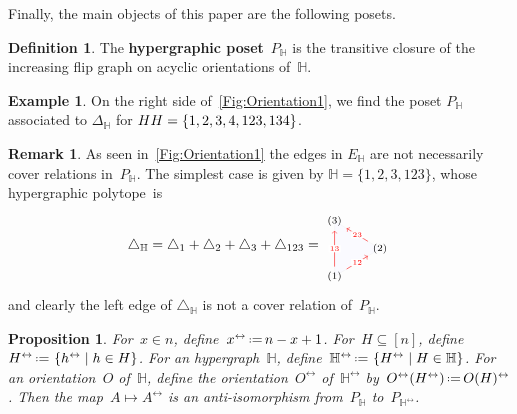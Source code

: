 \documentclass[reqno]{amsart}
\newtheorem{proposition}[theorem]{Proposition}
\theoremstyle{definition}
\newtheorem{definition}[theorem]{Definition}
\newtheorem{example}[theorem]{Example}
\newtheorem{remark}[theorem]{Remark}
\newcommand{\set}[2]{\left\{ #1 \;\middle|\; #2 \right\}} %
\newcommand{\eqdef}{\mbox{\,\raisebox{0.2ex}{\scriptsize\ensuremath{\mathrm:}}\ensuremath{=}\,}} %
\newcommand{\simplex}{\triangle} %
\newcommand{\defn}[1]{\textbf{\textsf{\color{PineGreen} #1}}} %
\newcommand{\nantel}[1]{\todo[size=\tiny,color=red!30]{ #1 \\ \hfill --- N.}\,}
\newcommand{\HH}{\mathbb H}  %
\begin{document}
Finally, the main objects of this paper are the following posets.

\begin{definition}
The \defn{hypergraphic poset}~$P_\HH$ is the transitive closure of the increasing flip graph on acyclic orientations of~$\HH$.
\end{definition}

\begin{example} On the right side of~\cref{Fig:Orientation1}, we find the poset $P_\HH$ associated to $\Delta_\HH$ for $\\HH=\{ 1, 2, 3, 4, 123, 134 \}$. 
\nantel{done}
\end{example}

\begin{remark}
\label{rem:edgeNotCover}
As seen in~\cref{Fig:Orientation1} the edges in $E_\HH$ are not necessarily cover relations in~$P_\HH$.
The simplest case is given by
$\HH=\{ 1, 2, 3, 123 \}$, 
whose hypergraphic polytope~is
\[
	\simplex_\HH = \simplex_1 + \simplex_2 + \simplex_3 + \simplex_{123} =
	\begin{tikzpicture}[scale=.7,baseline=.0cm]
		\draw [color=gray!10,fill=blue!2] (0,-1)--(0,1)--(1.632,0)--(0,-1) ; 
		\node (a) at (0,-1) {$\scriptstyle (1)$};
		\node (b) at (1.632,0) {$\scriptstyle (2)$};
		\node (c) at (0,1) {$\scriptstyle (3)$};
		\path[color=red, ->] (a) edge node[fill=white,inner sep=1pt, font=\tiny ] {$ \scriptscriptstyle 13 $} (c);
		\path[color=red, ->] (a) edge node[fill=white,inner sep=1pt, font=\tiny ] {$\scriptscriptstyle  12 $} (b);
		\path[color=red, ->] (b) edge node[fill=white,inner sep=1pt, font=\tiny ] {$ \scriptscriptstyle 23 $} (c);
	\end{tikzpicture}
\]
and clearly the left edge of $\simplex_\HH$ is not a cover relation of~$P_\HH$.
\end{remark}

\begin{proposition}
\label{prop:antiIsomorphism}
For~$x \in n$, define~$x^\leftrightarrow \eqdef n-x+1$.
For~$H \subseteq [n]$, define~$H^\leftrightarrow \eqdef \set{h^\leftrightarrow}{h \in H}$.
For an hypergraph~$\HH$, define~$\HH^\leftrightarrow \eqdef \set{H^\leftrightarrow}{H \in \HH}$.
For an orientation~$O$ of~$\HH$, define the orientation~$O^\leftrightarrow$ of~$\HH^\leftrightarrow$ by~$O^\leftrightarrow(H^\leftrightarrow) \eqdef O(H)^\leftrightarrow$.
Then the map~$A \mapsto A^\leftrightarrow$ is an anti-isomorphism from~$P_\HH$ to~$P_{\HH^\leftrightarrow}$.
\end{proposition}
\end{document}
